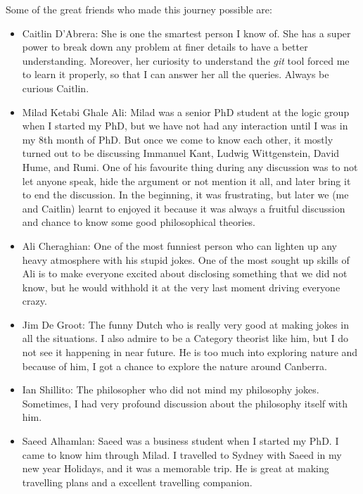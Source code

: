   
Some of the great friends who made this journey possible are:
\begin{itemize}
\item Caitlin D'Abrera: 
  She is one the smartest person I know of. She has a super power to break down any problem at finer details 
  to have a better understanding. Moreover, her curiosity to understand  the \textit{git} tool  forced me to learn it properly, 
  so that I can answer her all the queries. Always be curious Caitlin. 
  
 \item Milad Ketabi Ghale Ali: 
 Milad was a senior PhD student at the logic group when I started my PhD, 
 but we have not had any interaction until I was in my 8th month of PhD. But once 
 we come to know each other, it mostly turned out to be discussing 
 Immanuel Kant, Ludwig Wittgenstein, David Hume, and Rumi. 
 One of his favourite thing during any discussion was to
 not let anyone speak, hide the argument or not mention it all, and later bring it 
 to end the discussion. In the beginning, it was frustrating, but later we (me and 
 Caitlin) learnt to enjoyed it because it was always a fruitful discussion
 and chance to know some good philosophical theories.  
 
 \item  Ali Cheraghian:
  One of the most funniest person who can lighten up any heavy atmosphere 
  with his stupid jokes.  One of the most sought up skills of Ali is to 
  make everyone excited about disclosing something that we did not know, 
  but he would withhold it at the  very last moment driving everyone crazy. 
  
 
  \item   Jim De Groot:
  The funny Dutch who is really very good at making jokes in all the situations. I also 
  admire to be a Category theorist like him, but I do not see it happening in near 
  future. He is too much into exploring nature and because of him, I got a chance 
  to explore the nature around Canberra. 
  
  \item  Ian Shillito:
  The philosopher who did not mind my philosophy jokes.  Sometimes, I had very 
  profound discussion about the philosophy itself with him. 
  
  
  
  \item Saeed Alhamlan: 
  Saeed was a business student when I started my PhD. I came to know him through 
  Milad. I travelled to Sydney with Saeed in my new year Holidays, and it was 
  a memorable trip. He is great at making travelling plans and a excellent travelling 
  companion. 
  
\end{itemize} 


